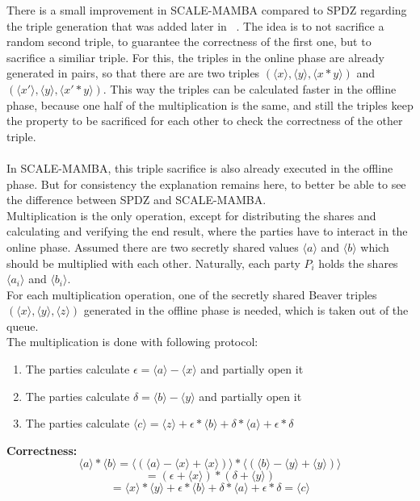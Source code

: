 \documentclass[english,runningheads,a4paper]{llncs}[2018/03/10]
\begin{document}
There is a small improvement in SCALE-MAMBA compared to SPDZ regarding the triple generation that was added later in ~\cite{cryptoeprint:2017:123}. The idea is to not sacrifice a random second triple, to guarantee the correctness of the first one, but to sacrifice a similiar triple. For this, the triples in the online phase are already generated in pairs, so that there are are two triples \( (\langle x \rangle ,\langle y \rangle , \langle x*y \rangle ) \) and \( (\langle x' \rangle ,\langle y\rangle , \langle x'*y\rangle ) \). This way the triples can be calculated faster in the offline phase, because one half of the multiplication is the same, and still the triples keep the property to be sacrificed for each other to check the correctness of the other triple.\\\\

In SCALE-MAMBA, this triple sacrifice is also already executed in the offline phase. But for consistency the explanation remains here, to better be able to see the difference between SPDZ and SCALE-MAMBA.\\


Multiplication is the only operation, except for distributing the shares and calculating and verifying the end result, where the parties have to interact in the online phase.
Assumed there are two secretly shared values \( \langle a \rangle\) and \( \langle b \rangle\) which should be multiplied with each other. Naturally, each party $P_i$ holds the shares \(\langle a_i\rangle \) and \(\langle b_i\rangle \).\\
For each multiplication operation, one of the secretly shared Beaver triples \( (\langle x \rangle ,\langle y\rangle , \langle z\rangle )\) generated in the offline phase is needed, which is taken out of the queue.\\ The multiplication is done with following protocol:
\begin{enumerate}
\item The parties calculate \( \epsilon = \langle a \rangle - \langle x \rangle \) and partially open it
\item The parties calculate \( \delta = \langle b \rangle - \langle y \rangle \) and partially open it
\item The parties calculate \( \langle c \rangle = \langle z \rangle + \epsilon * \langle b \rangle + \delta * \langle a \rangle + \epsilon * \delta \) 
\end{enumerate}
\textbf{Correctness:} 
$$  \langle a \rangle * \langle b \rangle = \langle ( \langle a \rangle- \langle x \rangle+ \langle x \rangle) \rangle * \langle ( \langle b \rangle- \langle y \rangle+ \langle y \rangle) \rangle$$
$$ = ( \epsilon  +\langle  x \rangle ) * ( \delta  + \langle y \rangle )$$
$$ = \langle x \rangle * \langle y \rangle + \epsilon * \langle b \rangle + \delta * \langle a \rangle + \epsilon * \delta =  \langle c \rangle $$
\end{document}
